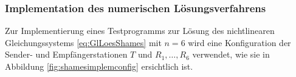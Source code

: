 \documentclass[a4paper,12pt]{article}
\numberwithin{equation}{section}
\begin{document}
\subsubsection{Implementation des numerischen Lösungsverfahrens}
Zur Implementierung eines Testprogramms zur Lösung des nichtlinearen Gleichungssystems \eqref{eq:GlLoesShames} mit $n=6$ wird eine Konfiguration der Sender- und Empfängerstationen $T$ und $R_1,\dots,R_6$ verwendet, wie sie in Abbildung \ref{fig:shamesimplemconfig} ersichtlich ist.
\begin{figure}[h]
\centering



\end{figure}
\end{document}
